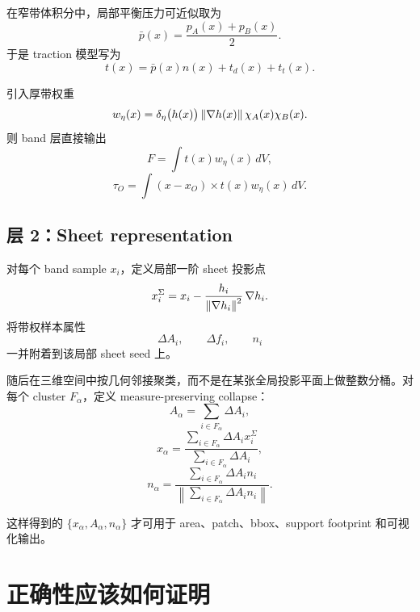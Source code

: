 \documentclass[12pt,a4paper]{ctexart}
\begin{document}
在窄带体积分中，局部平衡压力可近似取为
\begin{equation}
    \bar p(x)=\frac{p_A(x)+p_B(x)}{2}.
\end{equation}
于是 traction 模型写为
\begin{equation}
    t(x)=\bar p(x)n(x)+t_d(x)+t_t(x).
\end{equation}

引入厚带权重
\begin{equation}
    w_\eta(x)=\delta_\eta\bigl(h(x)\bigr)\,\norm{\nabla h(x)}\,\chi_A(x)\chi_B(x).
\end{equation}
则 band 层直接输出
\begin{equation}
    F = \int t(x)w_\eta(x)\,dV,
\end{equation}
\begin{equation}
    \tau_O = \int (x-x_O)\times t(x)w_\eta(x)\,dV.
\end{equation}

\subsection{层 2：Sheet representation}
对每个 band sample $x_i$，定义局部一阶 sheet 投影点
\begin{equation}
    x_i^{\Sigma}=x_i-\frac{h_i}{\norm{\nabla h_i}^2}\,\nabla h_i.
\end{equation}
将带权样本属性
\begin{equation}
    \Delta A_i,\qquad \Delta f_i,\qquad n_i
\end{equation}
一并附着到该局部 sheet seed 上。

随后在三维空间中按几何邻接聚类，而不是在某张全局投影平面上做整数分桶。对每个 cluster $F_\alpha$，定义 measure-preserving collapse：
\begin{equation}
    A_\alpha = \sum_{i\in F_\alpha}\Delta A_i,
\end{equation}
\begin{equation}
    x_\alpha = \frac{\sum_{i\in F_\alpha}\Delta A_i x_i^{\Sigma}}{\sum_{i\in F_\alpha}\Delta A_i},
\end{equation}
\begin{equation}
    n_\alpha = \frac{\sum_{i\in F_\alpha}\Delta A_i n_i}{\left\|\sum_{i\in F_\alpha}\Delta A_i n_i\right\|}.
\end{equation}

这样得到的 $\{x_\alpha,A_\alpha,n_\alpha\}$ 才可用于 area、patch、bbox、support footprint 和可视化输出。

\section{正确性应该如何证明}
\end{document}
